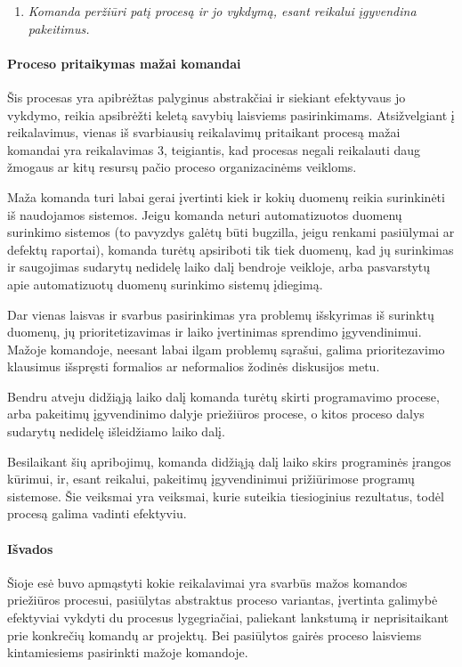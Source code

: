 \documentclass[12pt, a4paper, lithuanian, final]{article}
\begin{document}
\begin{enumerate}
	\setcounter{enumi}{\thereqList}
	\item \textit{Komanda peržiūri patį procesą ir jo vykdymą, esant reikalui įgyvendina pakeitimus.}
	\setcounter{reqList}{\theenumi}
\end{enumerate}


\paragraph{Proceso pritaikymas mažai komandai}

Šis procesas yra apibrėžtas palyginus abstrakčiai ir siekiant efektyvaus jo vykdymo, reikia apsibrėžti keletą savybių laisviems pasirinkimams.
Atsižvelgiant į reikalavimus, vienas iš svarbiausių reikalavimų pritaikant procesą mažai komandai yra reikalavimas 3, teigiantis, kad procesas negali reikalauti daug žmogaus ar kitų resursų pačio proceso organizacinėms veikloms.


Maža komanda turi labai gerai įvertinti kiek ir kokių duomenų reikia surinkinėti iš naudojamos sistemos.
Jeigu komanda neturi automatizuotos duomenų surinkimo sistemos (to pavyzdys galėtų būti bugzilla, jeigu renkami pasiūlymai ar defektų raportai), komanda turėtų apsiriboti tik tiek duomenų, kad jų surinkimas ir saugojimas sudarytų nedidelę laiko dalį bendroje veikloje, arba pasvarstytų apie automatizuotų duomenų surinkimo sistemų įdiegimą.


Dar vienas laisvas ir svarbus pasirinkimas yra problemų išskyrimas iš surinktų duomenų, jų prioritetizavimas ir laiko įvertinimas sprendimo įgyvendinimui.
Mažoje komandoje, neesant labai ilgam problemų sąrašui, galima prioritezavimo klausimus išspręsti formalios ar neformalios žodinės diskusijos metu.


Bendru atveju didžiąją laiko dalį komanda turėtų skirti programavimo procese, arba pakeitimų įgyvendinimo dalyje priežiūros procese, o kitos proceso dalys sudarytų nedidelę išleidžiamo laiko dalį.

Besilaikant šių apribojimų, komanda didžiąją dalį laiko skirs programinės įrangos kūrimui, ir, esant reikalui, pakeitimų įgyvendinimui prižiūrimose programų sistemose.
Šie veiksmai yra veiksmai, kurie suteikia tiesioginius rezultatus, todėl procesą galima vadinti efektyviu.


\paragraph{Išvados}

Šioje esė buvo apmąstyti kokie reikalavimai yra svarbūs mažos komandos priežiūros procesui, pasiūlytas abstraktus proceso variantas, įvertinta galimybė efektyviai vykdyti du procesus lygegriačiai, paliekant lankstumą ir neprisitaikant prie konkrečių komandų ar projektų.
Bei pasiūlytos gairės proceso laisviems kintamiesiems pasirinkti mažoje komandoje.
\end{document}
